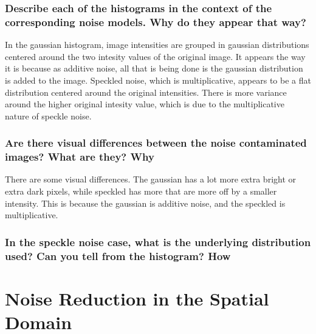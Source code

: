 \documentclass[article, 1.5space, letterpaper, 12pt, oneside, header, footer]{SydeClass}
\begin{document}
\subsubsection{ Describe each of the histograms in the context of the corresponding noise models. Why do they appear
that way?}
In the gaussian histogram, image intensities are grouped in gaussian distributions centered around the two intesity values of the original image. It appears the way it is because as additive noise, all that is being done is the gaussian distribution is added to the image. Speckled noise, which is multiplicative, appears to be a flat distribution centered around the original intensities. There is more variance around the higher original intesity value, which is due to the multiplicative nature of speckle noise.

\subsubsection{Are there visual differences between the noise contaminated images? What are they? Why}
There are some visual differences. The gaussian has a lot more extra bright or extra dark pixels, while speckled has more that are more off by a smaller intensity. This is because the gaussian is additive noise, and the speckled is multiplicative.

\subsubsection{ In the speckle noise case, what is the underlying distribution used? Can you tell from the histogram?
How}


\appendix
\newpage


\section{Noise Reduction in the Spatial Domain}

\clearpage
\end{document}
